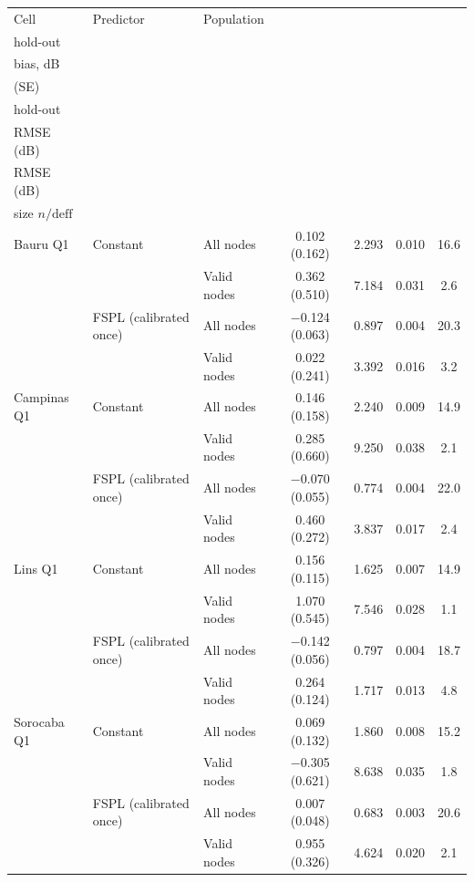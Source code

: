 \begin{tabular}{lllcccc}
\toprule
Cell & Predictor & Population & \celula{Block \\ \relax hold-out \\ \relax bias, dB \\ \relax (SE)} & \celula{Block \\ \relax hold-out \\ \relax RMSE (dB)} & \celula{Random-sample \\ \relax RMSE (dB)} & \celula{Effective \\ \relax size $n/\mathrm{deff}$} \\
\midrule
Bauru Q1 & Constant & All nodes & 0.102 (0.162) & 2.293 & 0.010 & 16.6 \\
 &  & Valid nodes & 0.362 (0.510) & 7.184 & 0.031 & 2.6 \\
 & FSPL (calibrated once) & All nodes & $-$0.124 (0.063) & 0.897 & 0.004 & 20.3 \\
 &  & Valid nodes & 0.022 (0.241) & 3.392 & 0.016 & 3.2 \\
\midrule
Campinas Q1 & Constant & All nodes & 0.146 (0.158) & 2.240 & 0.009 & 14.9 \\
 &  & Valid nodes & 0.285 (0.660) & 9.250 & 0.038 & 2.1 \\
 & FSPL (calibrated once) & All nodes & $-$0.070 (0.055) & 0.774 & 0.004 & 22.0 \\
 &  & Valid nodes & 0.460 (0.272) & 3.837 & 0.017 & 2.4 \\
\midrule
Lins Q1 & Constant & All nodes & 0.156 (0.115) & 1.625 & 0.007 & 14.9 \\
 &  & Valid nodes & 1.070 (0.545) & 7.546 & 0.028 & 1.1 \\
 & FSPL (calibrated once) & All nodes & $-$0.142 (0.056) & 0.797 & 0.004 & 18.7 \\
 &  & Valid nodes & 0.264 (0.124) & 1.717 & 0.013 & 4.8 \\
\midrule
Sorocaba Q1 & Constant & All nodes & 0.069 (0.132) & 1.860 & 0.008 & 15.2 \\
 &  & Valid nodes & $-$0.305 (0.621) & 8.638 & 0.035 & 1.8 \\
 & FSPL (calibrated once) & All nodes & 0.007 (0.048) & 0.683 & 0.003 & 20.6 \\
 &  & Valid nodes & 0.955 (0.326) & 4.624 & 0.020 & 2.1 \\
\bottomrule
\end{tabular}
